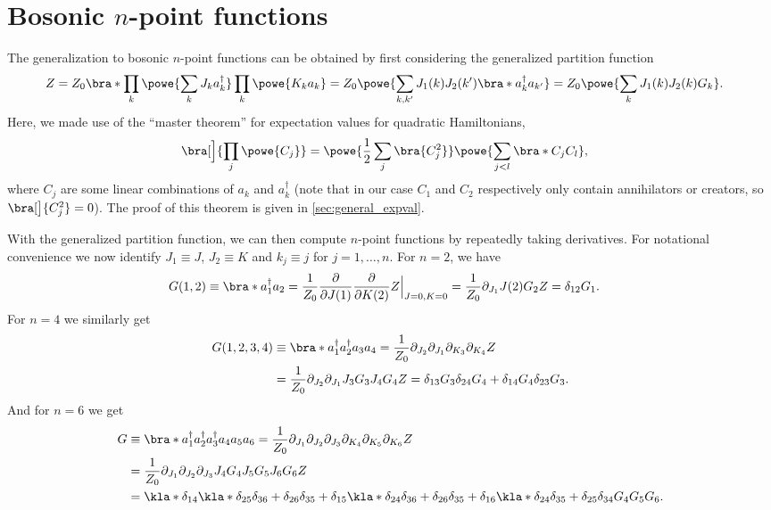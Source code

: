 \documentclass[english, parskip=full]{scrartcl}
\begin{document}
\section{Bosonic $n$-point functions}
The generalization to bosonic $n$-point functions can be obtained by first considering the generalized partition function
\begin{align}
Z &= Z_0 \bra*{\prod_k \powe{\sum_k J_k a_k^\dagger}\prod_k \powe{K_k a_k}} = Z_0 \powe{\sum_{k,k'} J_1(k) J_2(k') \bra*{a_k^\dagger a_{k'}}} = Z_0 \powe{\sum_{k}J_1(k)J_2(k) G_{k}}.
\end{align}
Here, we made use of the ``master theorem'' for expectation values for quadratic Hamiltonians,
\begin{align}
\bra[\Big]{\prod_j \powe{C_j}} &= \powe{\frac{1}{2} \sum_j \bra{C_j^2}} \powe{\sum_{j<l} \bra*{C_j C_{l}}},
\end{align}
where $C_j$ are some linear combinations of $a_k$ and $a_k^\dagger$ (note that in our case $C_1$ and $C_2$ respectively only contain annihilators or creators, so $\bra[\big]{C_j^2} = 0$).
The proof of this theorem is given in \autoref{sec:general_expval}.

With the generalized partition function, we can then compute $n$-point functions by repeatedly taking derivatives.
For notational convenience we now identify $J_1\equiv J$, $J_2 \equiv K$ and $k_j\equiv j$ for $j=1,\dots,n$.
For $n=2$, we have
\begin{align}
G(1,2) &\equiv \bra*{a_1^\dagger a_{2}} = \frac{1}{Z_0} \frac{\partial}{\partial J(1)} \frac{\partial}{\partial K(2)} Z \Big\vert_{J=0,K=0} = \frac{1}{Z_0} \partial_{J_1} J(2) G_{2} Z = \delta_{12} G_1.
\end{align}
For $n=4$ we similarly get
\begin{align}
G(1,2,3,4) &\equiv \bra*{a_1^\dagger a_{2}^\dagger a_{3} a_{4}} = \frac{1}{Z_0} \partial_{J_2} \partial_{J_1} \partial_{K_3} \partial_{K_4} Z \\
&= \frac{1}{Z_0} \partial_{J_2} \partial_{J_1} J_3G_3J_4G_4 Z = \delta_{13}G_3 \delta_{24}G_4 + \delta_{14}G_4 \delta_{23}G_3.
\end{align}
And for $n=6$ we get
\begin{align}
G &\equiv \bra*{a_1^\dagger a_{2}^\dagger a_{3}^\dagger a_{4} a_{5} a_6} = \frac{1}{Z_0} \partial_{J_1} \partial_{J_2} \partial_{J_3} \partial_{K_4} \partial_{K_5} \partial_{K_6} Z \\
&= \frac{1}{Z_0} \partial_{J_1} \partial_{J_2} \partial_{J_3} J_4G_4J_5G_5J_6G_6 Z \\
&= \kla*{\delta_{14} \kla*{\delta_{25} \delta_{36} + \delta_{26} \delta_{35}} + \delta_{15}\kla*{\delta_{24} \delta_{36} + \delta_{26} \delta_{35}} + \delta_{16} \kla*{\delta_{24} \delta_{35} + \delta_{25} \delta_{34}}} G_4G_5G_6.
\end{align}
\end{document}
